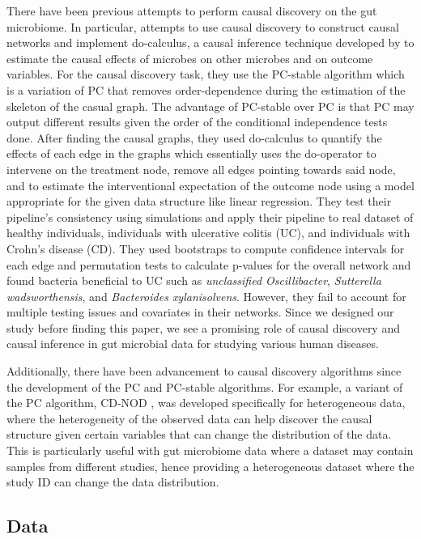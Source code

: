 \documentclass[12pt,letterpaper]{article}
\begin{document}
There have been previous attempts to perform causal discovery on the gut microbiome. In particular, \citep{sazal2021causalgut} attempts to use causal discovery to construct causal networks and implement do-calculus, a causal inference technique developed by \citep{pearl2016primer} to estimate the causal effects of microbes on other microbes and on outcome variables. For the causal discovery task, they use the PC-stable algorithm \citep{colombo2014pcstable} which is a variation of PC that removes order-dependence during the estimation of the skeleton of the casual graph. The advantage of PC-stable over PC is that PC may output different results given the order of the conditional independence tests done. After finding the causal graphs, they used do-calculus to quantify the effects of each edge in the graphs which essentially uses the do-operator to intervene on the treatment node, remove all edges pointing towards said node, and to estimate the interventional expectation of the outcome node using a model appropriate for the given data structure like linear regression. They test their pipeline’s consistency using simulations and apply their pipeline to real dataset of healthy individuals, individuals with ulcerative colitis (UC), and individuals with Crohn’s disease (CD). They used bootstraps to compute confidence intervals for each edge and permutation tests to calculate p-values for the overall network and found bacteria beneficial to UC such as \textit{unclassified Oscillibacter}, \textit{Sutterella wadsworthensis}, and \textit{Bacteroides xylanisolvens}. However, they fail to account for multiple testing issues and covariates in their networks. Since we designed our study before finding this paper, we see a promising role of causal discovery and causal inference in gut microbial data for studying various human diseases. 

Additionally, there have been advancement to causal discovery algorithms since the development of the PC and PC-stable algorithms. For example, a variant of the PC algorithm, CD-NOD \citep{huang2019cdnod}, was developed specifically for heterogeneous data, where the heterogeneity of the observed data can help discover the causal structure given certain variables that can change the distribution of the data. This is particularly useful with gut microbiome data where a dataset may contain samples from different studies, hence providing a heterogeneous dataset where the study ID can change the data distribution. 

\subsection{Data}
\end{document}
